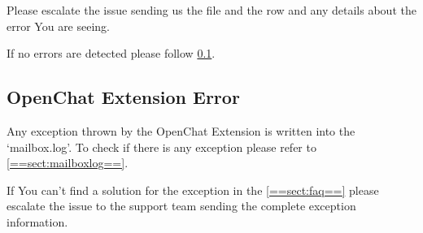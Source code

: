 Please escalate the issue sending us the file and the row and any details about the error You are seeing\footnotemark[1].

If no errors are detected please follow \ref{==sect:ext-err==}.

\subsection[Extension Error]{OpenChat Extension Error}
\label{==sect:ext-err==}
Any exception thrown by the OpenChat Extension is written into the `mailbox.log'. To check if there is any exception please
refer to \ref{==sect:mailboxlog==}.

If You can't find a solution for the exception in the \ref{==sect:faq==} please escalate the issue to the support team
sending the complete exception information\footnotemark[1].



